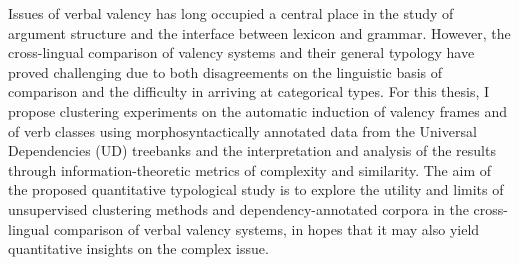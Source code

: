 Issues of verbal valency has long occupied a central place in the study of argument structure and the interface between lexicon and grammar. However, the cross-lingual comparison of valency systems and their general typology have proved challenging due to both disagreements on the linguistic basis of comparison and the difficulty in arriving at categorical types. For this thesis, I propose clustering experiments on the automatic induction of valency frames and of verb classes using morphosyntactically annotated data from the Universal Dependencies (UD) treebanks and the interpretation and analysis of the results through information-theoretic metrics of complexity and similarity. The aim of the proposed quantitative typological study is to explore the utility and limits of unsupervised clustering methods and dependency-annotated corpora in the cross-lingual comparison of verbal valency systems, in hopes that it may also yield quantitative insights on the complex issue.